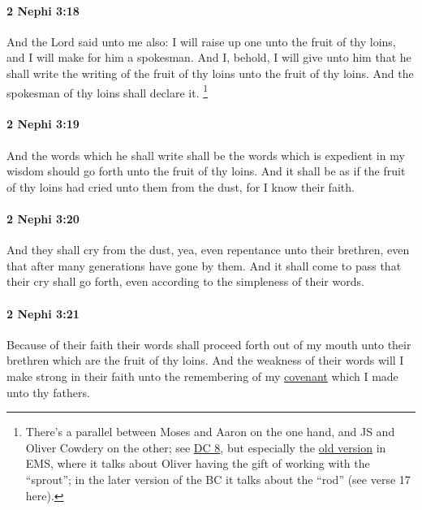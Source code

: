 		\paragraph{2 Nephi 3:18} %
			\label{2NEPHI-3-18}

			And the Lord said unto me also:
			I will raise up one unto the fruit of thy loins,
			and I will make for him a spokesman.
			And I, behold, I will give unto him
			that he shall write the writing of the fruit of thy loins
			unto the fruit of thy loins.
			And the spokesman of thy loins shall declare it.%
				\footnote{%
					\label{2NEPHI-3-17-spokesman}%
					There's a parallel between Moses and Aaron on the one hand, and JS and Oliver Cowdery on the other; see \hyperref[DC8]{DC 8}, but especially the \hyperref[EMS-1828-1829-JS-APR-1829-B]{old version} in EMS, where it talks about Oliver having the gift of working with the ``sprout''; in the later version of the BC it talks about the ``rod'' (see verse 17 here).
					}

		\paragraph{2 Nephi 3:19} %
			\label{2NEPHI-3-19}

			And the words which he shall write shall be the words
			which is expedient in my wisdom should go forth unto the fruit of thy loins.
			And it shall be as if the fruit of thy loins had cried unto them from the dust,
			for I know their faith.

		\paragraph{2 Nephi 3:20} %
			\label{2NEPHI-3-20}

			And they shall cry from the dust,
			yea, even repentance unto their brethren,
			even that after many generations have gone by them.
			And it shall come to pass that their cry shall go forth,
			even according to the simpleness of their words.

		\paragraph{2 Nephi 3:21} %
			\label{2NEPHI-3-21}

			Because of their faith their words shall proceed forth out of my mouth
			unto their brethren which are the fruit of thy loins.
			And the weakness of their words will I make strong in their faith
			unto the remembering of my \hyperref[COVENANT]{covenant} which I made unto thy fathers.

